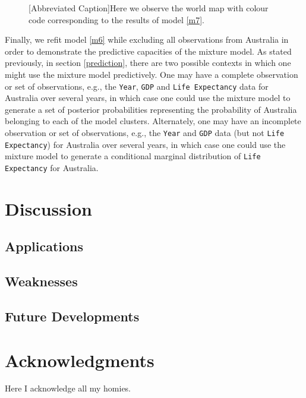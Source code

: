 \documentclass[10pt]{olplainarticle}\usepackage[]{graphicx}\usepackage[]{color}
\begin{document}
\begin{figure}

[Abbreviated Caption]{Here we observe the world map with colour code corresponding to the results of model \ref{m7}.}
\end{figure}


Finally, we refit model \ref{m6} while excluding all observations from Australia in order to demonstrate the predictive capacities of the mixture model. As stated previously, in section \ref{prediction}, there are two possible contexts in which one might use the mixture model predictively. One may have a complete observation or set of observations, e.g., the \texttt{Year}, \texttt{GDP} and \texttt{Life Expectancy} data for Australia over several years, in which case one could use the mixture model to generate a set of posterior probabilities representing the probability of Australia belonging to each of the model clusters. Alternately, one may have an incomplete observation or set of observations, e.g., the \texttt{Year} and \texttt{GDP} data (but not \texttt{Life Expectancy}) for Australia over several years, in which case one could use the mixture model to generate a conditional marginal distribution of \texttt{Life Expectancy} for Australia.




\section{Discussion}

\subsection{Applications}

\subsection{Weaknesses}

\subsection{Future Developments}


\section*{Acknowledgments}

Here I acknowledge all my homies.


\end{document}
